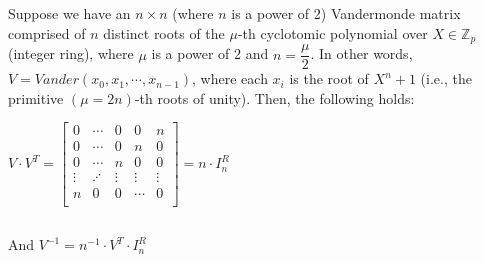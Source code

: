 \begin{tcolorbox}[title={\textbf{\tboxtheorem{\ref*{subsec:vandermonde-euler}} Vandermonde Matrix with Roots of  \text{(power-of-2)}-th Cyclotomic Polynomial}}]

Suppose we have an $n \times n$ (where $n$ is a power of 2) Vandermonde matrix comprised of $n$ distinct roots of the $\mu$-th cyclotomic polynomial over $X \in \mathbb{Z}_p$ (integer ring), where $\mu$ is a power of 2 and $n = \dfrac{\mu}{2}$. In other words, $V = \mathit{Vander}(x_0, x_1, \cdots, x_{n-1})$, where each $x_i$ is the root of $X^n + 1$ (i.e., the primitive $(\mu=2n)$-th roots of unity). Then, the following holds:

$V \cdot V^T = \begin{bmatrix}
0 & \cdots & 0 & 0 & n\\
0 & \cdots & 0 & n & 0\\
0 & \cdots & n & 0 & 0\\
\vdots & \iddots & \vdots & \vdots & \vdots \\
n & 0 & 0 & \cdots & 0\\
\end{bmatrix} = n \cdot I^R_n$

$ $

And $V^{-1} = n^{-1}\cdot V^T \cdot I_n^R$


\end{tcolorbox}
